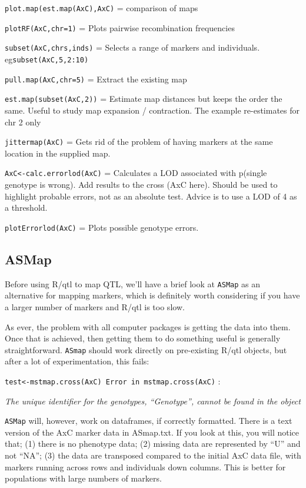 \documentclass[
]{book}
\begin{document}
\texttt{plot.map(est.map(AxC),AxC)} = comparison of maps

\texttt{plotRF(AxC,chr=1)} = Plots pairwise recombination frequencies

\texttt{subset(AxC,chrs,inds)} = Selects a range of markers and individuals. eg\texttt{subset(AxC,5,2:10)}

\texttt{pull.map(AxC,chr=5)} = Extract the existing map

\texttt{est.map(subset(AxC,2))} = Estimate map distances but keeps the order the same. Useful to study map expansion / contraction. The example re-estimates for chr 2 only

\texttt{jittermap(AxC)} = Gets rid of the problem of having markers at the same location in the supplied map.

\texttt{AxC\textless{}-calc.errorlod(AxC)} = Calculates a LOD associated with p(single genotype is wrong). Add results to the cross (AxC here). Should be used to highlight probable errors, not as an absolute test. Advice is to use a LOD of 4 as a threshold.

\texttt{plotErrorlod(AxC)} = Plots possible genotype errors.

\hypertarget{asmap}{%
\subsection{ASMap}\label{asmap}}

Before using R/qtl to map QTL, we'll have a brief look at \texttt{ASMap} as an alternative for mapping markers, which is definitely worth considering if you have a larger number of markers and R/qtl is too slow.

As ever, the problem with all computer packages is getting the data into them. Once that is achieved, then getting them to do something useful is generally straightforward. \texttt{ASmap} should work directly on pre-existing R/qtl objects, but after a lot of experimentation, this fails:

\texttt{test\textless{}-mstmap.cross(AxC)\ Error\ in\ mstmap.cross(AxC)} :

\emph{The unique identifier for the genotypes, ``Genotype'', cannot be found in the object}

\texttt{ASMap} will, however, work on dataframes, if correctly formatted. There is a text version of the AxC marker data in ASmap.txt. If you look at this, you will notice that; (1) there is no phenotype data; (2) missing data are represented by ``U'' and not ``NA''; (3) the data are transposed compared to the initial AxC data file, with markers running across rows and individuals down columns. This is better for populations with large numbers of markers.
\end{document}
